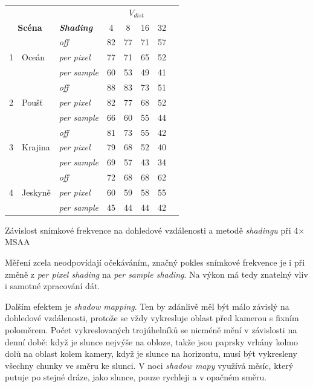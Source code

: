 \begin{tableFloat}[H]
	\centering
	\begin{tabular}{r l l || c c c c c}
		&&& \multicolumn{4}{c}{$V_{dist}$} \\
		\multicolumn{2}{c}{\textbf{Scéna}} & \textbf{\textit{Shading}} & 4 & 8 & 16 & 32 \\ \hline \hline
		\multirow{3}{*}{1} & \multirow{3}{*}{Oceán} & \textit{off} & 82 & 77 & 71 & 57 \\
		&& \textit{per pixel} & 77 & 71 & 65 & 52 \\
		&& \textit{per sample} & 60 & 53 & 49 & 41 \\ \hline
		
		\multirow{3}{*}{2} & \multirow{3}{*}{Poušť} & \textit{off} & 88 & 83 & 73 & 51 \\
		&& \textit{per pixel} & 82 & 77 & 68 & 52 \\
		&& \textit{per sample} & 66 & 60 & 55 & 44 \\ \hline
		
		\multirow{3}{*}{3} & \multirow{3}{*}{Krajina} & \textit{off} & 81 & 73 & 55 & 42 \\
		&& \textit{per pixel} & 79 & 68 & 52 & 40 \\
		&& \textit{per sample} & 69 & 57 & 43 & 34 \\ \hline
		
		\multirow{3}{*}{4} & \multirow{3}{*}{Jeskyně} & \textit{off} & 72 & 68 & 68 & 62 \\
		&& \textit{per pixel} & 60 & 59 & 58 & 55 \\
		&& \textit{per sample} & 45 & 44 & 44 & 42 \\ \hline
	\end{tabular}
	\caption{Závislost snímkové frekvence na dohledové vzdálenosti a metodě \textit{shadingu} při 4× MSAA}
\end{tableFloat}

Měření zcela neodpovídají očekáváním, značný pokles snímkové frekvence je i při změně z \textit{per pixel shading} na \textit{per sample shading}. Na výkon má tedy znatelný vliv i samotné zpracování dát.

Dalším efektem je \textit{shadow mapping}. Ten by zdánlivě měl být málo závislý na dohledové vzdálenosti, protože se vždy vykresluje oblast před kamerou s fixním poloměrem. Počet vykreslovaných trojúhelníků se nicméně mění v závislosti na denní době: když je slunce nejvýše na obloze, takže jsou paprsky vrhány kolmo dolů na oblast kolem kamery, když je slunce na horizontu, musí být vykresleny všechny chunky ve směru ke slunci. V noci \textit{shadow mapy} využívá měsíc, který putuje po stejné dráze, jako slunce, pouze rychleji a v opačném směru.

